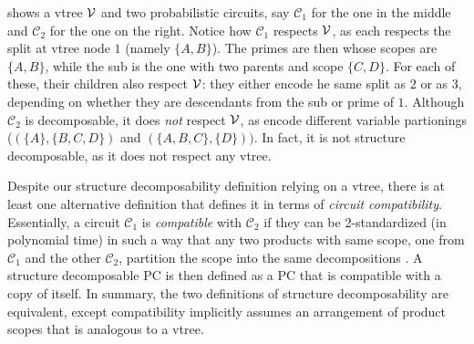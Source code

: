  shows a vtree $\operatorname{\mathcal{V}}$ and two probabilistic circuits, say
$\mathcal{C}_1$ for the one in the middle and $\mathcal{C}_2$ for the one on the right. Notice how
$\mathcal{C}_1$ respects $\operatorname{\mathcal{V}}$, as each \inode[fill=boxred!70]{\newProdNode} respects the split
at vtree node $1$ (namely $\{A,B\}$). The primes are then \inode[fill=boxpurple!60]{\newSumNode}
whose scopes are $\{A,B\}$, while the sub is the one with two parents and scope $\{C,D\}$. For each
of these, their children \inode[fill=boxbrown!60]{\newProdNode} also respect $\operatorname{\mathcal{V}}$: they either
encode he same split as $2$ or as $3$, depending on whether they are descendants from the sub or
prime of $1$. Although $\mathcal{C}_2$ is decomposable, it does \emph{not} respect $\operatorname{\mathcal{V}}$, as
\inode[fill=boxred!70]{\newProdNode} encode different variable partionings ($(\{A\},\{B,C,D\})$ and
$(\{A,B,C\},\{D\}))$. In fact, it is not structure decomposable, as it does not respect any vtree.

Despite our structure decomposability definition relying on a vtree, there is at least one
alternative definition that defines it in terms of \emph{circuit compatibility}. Essentially, a
circuit $\mathcal{C}_1$ is \emph{compatible} with $\mathcal{C}_2$ if they can be 2-standardized (in
polynomial time) in such a way that any two products with same scope, one from $\mathcal{C}_1$ and
the other $\mathcal{C}_2$, partition the scope into the same decompositions \citep{vergari21}. A
structure decomposable PC is then defined as a PC that is compatible with a copy of itself. In
summary, the two definitions of structure decomposability are equivalent, except compatibility
implicitly assumes an arrangement of product scopes that is analogous to a vtree.

